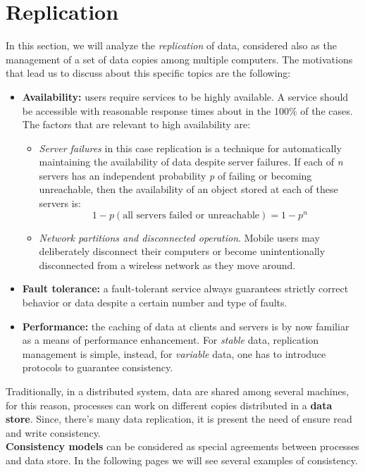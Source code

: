 \section{Replication}
In this section, we will analyze the \textit{replication} of data, considered also as the management of a set of data copies among multiple computers. The motivations that lead us to discuss about this specific topics are the following:
\begin{itemize}
	\item \textbf{Availability: }users require services to be highly available. A service should be accessible with reasonable response times about in the 100\% of the cases. The factors that are relevant to high availability are:
	\begin{itemize}
		\item \textit{Server failures} in this case replication is a technique for automatically maintaining the
		availability of data despite server failures. If each of \textit{n} servers has an independent probability \textit{p} of failing or becoming unreachable, then the availability of an object stored at each of these servers is:
		$$1 - p(\text{all servers failed or unreachable}) = 1-p^n$$
		\item \textit{Network partitions and disconnected operation}. Mobile users may deliberately disconnect their computers or become unintentionally disconnected from a wireless network as they move around.
	\end{itemize}
	\item \textbf{Fault tolerance: }a fault-tolerant service always guarantees strictly correct behavior or data despite a certain number and type of faults.
	\item \textbf{Performance: }the caching of data at clients and servers is by now
	familiar as a means of performance enhancement. For \textit{stable} data, replication management is simple, instead, for \textit{variable} data, one has to introduce protocols to guarantee consistency.
\end{itemize}
Traditionally, in a distributed system, data are shared among several machines, for this reason, processes can work on different copies distributed in a \textbf{data store}. Since, there's many data replication, it is present the need of ensure read and write consistency.\\

\textbf{Consistency models} can be considered as special agreements between processes and data store. In the following pages we will see several examples of consistency.\\

